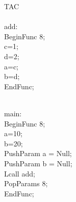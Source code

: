 \begin{latin}
TAC
\\
\\
\underline{\hspace{.05in}}add:
\\
BeginFunc 8;
\\
c=1;
\\
d=2;
\\
a=c;
\\
b=d;
\\
EndFunc;

\\
\underline{\hspace{.05in}}main:
\\
BeginFunc 8;
\\
a=10;
\\
b=20;
\\
PushParam a = Null;
\\
PushParam b = Null;
\\
Lcall \underline{\hspace{.05in}}add;
\\
PopParams 8;
\\
EndFunc;
\\
\end{latin}

